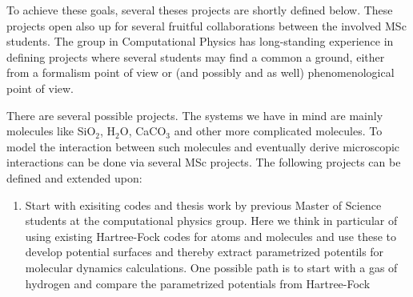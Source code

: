 \documentclass[%
oneside,                 %
final,                   %
10pt]{article}
\begin{document}
To achieve these goals, several theses projects are shortly defined
below. These projects open also up for several fruitful collaborations
between the involved MSc students. The group in Computational Physics
has long-standing experience in defining projects where several
students may find a common a ground, either from a formalism point of
view or (and possibly and as well) phenomenological point of view.

There are several possible projects. The systems we have in mind are
mainly molecules like SiO$_2$, H$_2$O, CaCO$_3$ and other more
complicated molecules. To model the interaction between such molecules
and eventually derive microscopic interactions can be done via several
MSc projects. The following projects can be defined and extended upon:

\begin{enumerate}
\item Start with exisiting codes and thesis work by previous Master of Science students at the computational physics group. Here we think in particular of using existing Hartree-Fock codes for atoms and molecules and use these to develop potential surfaces and thereby extract parametrized potentils for molecular dynamics calculations. One possible path is to start with a gas of hydrogen and compare the parametrized potentials from Hartree-Fock
\end{enumerate}
\end{document}
